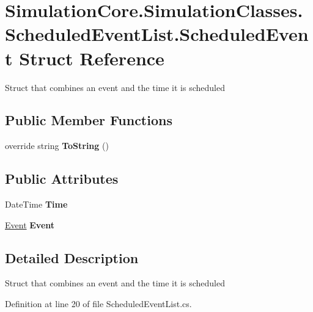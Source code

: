 \hypertarget{struct_simulation_core_1_1_simulation_classes_1_1_scheduled_event_list_1_1_scheduled_event}{}\section{Simulation\+Core.\+Simulation\+Classes.\+Scheduled\+Event\+List.\+Scheduled\+Event Struct Reference}
\label{struct_simulation_core_1_1_simulation_classes_1_1_scheduled_event_list_1_1_scheduled_event}


Struct that combines an event and the time it is scheduled  


\subsection*{Public Member Functions}
\begin{DoxyCompactItemize}
\item 
override string {\bfseries To\+String} ()\hypertarget{struct_simulation_core_1_1_simulation_classes_1_1_scheduled_event_list_1_1_scheduled_event_a0dfe8c6d4ea05696d2e4761dd21a85cc}{}\label{struct_simulation_core_1_1_simulation_classes_1_1_scheduled_event_list_1_1_scheduled_event_a0dfe8c6d4ea05696d2e4761dd21a85cc}

\end{DoxyCompactItemize}
\subsection*{Public Attributes}
\begin{DoxyCompactItemize}
\item 
Date\+Time {\bfseries Time}\hypertarget{struct_simulation_core_1_1_simulation_classes_1_1_scheduled_event_list_1_1_scheduled_event_a927cc05b173271f0352b68d3aefb8289}{}\label{struct_simulation_core_1_1_simulation_classes_1_1_scheduled_event_list_1_1_scheduled_event_a927cc05b173271f0352b68d3aefb8289}

\item 
\hyperlink{class_simulation_core_1_1_h_c_c_m_elements_1_1_event}{Event} {\bfseries Event}\hypertarget{struct_simulation_core_1_1_simulation_classes_1_1_scheduled_event_list_1_1_scheduled_event_a84d2805ca044de69e12236037ea81ca1}{}\label{struct_simulation_core_1_1_simulation_classes_1_1_scheduled_event_list_1_1_scheduled_event_a84d2805ca044de69e12236037ea81ca1}

\end{DoxyCompactItemize}


\subsection{Detailed Description}
Struct that combines an event and the time it is scheduled 



Definition at line 20 of file Scheduled\+Event\+List.\+cs.

